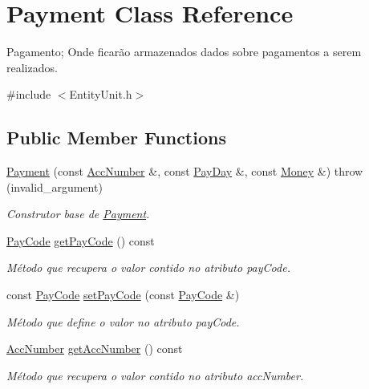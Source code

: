 \hypertarget{classPayment}{\section{Payment Class Reference}
\label{d5/d5e/classPayment}
}


Pagamento; Onde ficarão armazenados dados sobre pagamentos a serem realizados.  




{\ttfamily \#include $<$Entity\-Unit.\-h$>$}

\subsection*{Public Member Functions}
\begin{DoxyCompactItemize}
\item 
\hyperlink{classPayment_a91b7742c5f9b4617e4a3bce6507cce49}{Payment} (const \hyperlink{classAccNumber}{Acc\-Number} \&, const \hyperlink{classPayDay}{Pay\-Day} \&, const \hyperlink{classMoney}{Money} \&)  throw (invalid\-\_\-argument)
\begin{DoxyCompactList}\small\item\em Construtor base de \hyperlink{classPayment}{Payment}. \end{DoxyCompactList}\item 
\hyperlink{classPayCode}{Pay\-Code} \hyperlink{classPayment_a1d71998fa33e757bb350eb40895865ae}{get\-Pay\-Code} () const 
\begin{DoxyCompactList}\small\item\em Método que recupera o valor contido no atributo pay\-Code. \end{DoxyCompactList}\item 
const \hyperlink{classPayCode}{Pay\-Code} \hyperlink{classPayment_adf458db6331e53948a473a04a0d622a4}{set\-Pay\-Code} (const \hyperlink{classPayCode}{Pay\-Code} \&)
\begin{DoxyCompactList}\small\item\em Método que define o valor no atributo pay\-Code. \end{DoxyCompactList}\item 
\hyperlink{classAccNumber}{Acc\-Number} \hyperlink{classPayment_a66c51330aef2e045884e25618a194904}{get\-Acc\-Number} () const 
\begin{DoxyCompactList}\small\item\em Método que recupera o valor contido no atributo acc\-Number. \end{DoxyCompactList}\item 

\end{DoxyCompactItemize}
